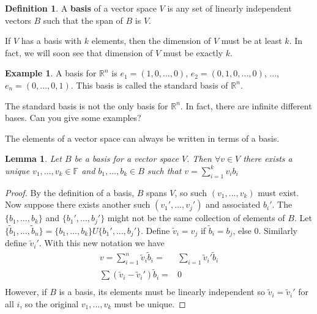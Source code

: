\documentclass[12pt,reqno]{amsart}
\def\F{\mathbb{F}}
\def\R{\mathbb{R}}
\newtheorem{lemma}{Lemma}[section]
\theoremstyle{definition}
\newtheorem{definition}{Definition}[section]
\newtheorem{example}{Example}[section]
\begin{document}
\begin{definition}
  A \textbf{basis} of a vector space $V$ is any set of linearly
  independent vectors $B$ such that the span of $B$ is $V$.
\end{definition}
If $V$ has a basis with $k$ elements, then the dimension of $V$ must
be at least $k$. In fact, we will soon see that dimension of $V$ must
be exactly $k$.
\begin{example}
  A basis for $\R^n$ is $e_1 = (1, 0, ..., 0 )$, $e_2 = (0, 1, 0, ...,
  0)$, $...$, $e_n = (0, ... , 0 , 1)$. This basis is called the
  standard basis of $\R^n$. 

  The standard basis is not the only basis for $\R^n$. In fact, there
  are infinite different bases. Can you give some examples?
\end{example}
The elements of a vector space can always be written in terms of a
basis. 
\begin{lemma} \label{lem:uniqueRep}
  Let $B$ be a basis for a vector space $V$. Then
  $\forall v \in V$ there exists a unique $v_1, ..., v_k \in \F$ and
  $b_1, ..., b_k \in B$
  such that $ v = \sum_{i=1}^k v_i b_i$  
\end{lemma}
\begin{proof}
  By the definition of a basis, $B$ spans $V$, so such
  $(v_1, ..., v_k)$ must exist. Now suppose there exists another such
  $(v_1', ..., v_j')$ and associated $b_i'$. The $\{b_1, ..., b_k\}$ and
  $\{b_1', ..., b_j'\}$ might not be the same collection of elements
  of $B$. Let $\{\tilde{b}_1, ..., \tilde{b}_n \} =  \{b_1, ...,
  b_k\} U \{b_1', ..., b_j'\}$. Define $\tilde{v}_i = v_j$ if
  $\tilde{b}_i = b_j$, else $0$. Similarly define $\tilde{v}_i'$. With
  this new notation we have
  \begin{align*}
    v = \sum_{i=1}^n \tilde{v}_i \tilde{b}_i = & \sum_{i=1} \tilde{v}_i' \tilde{b}_i \\
    \sum (\tilde{v}_i - \tilde{v}_i')\tilde{b}_i = & 0 \\
  \end{align*}
  However, if $B$ is a basis, its elements must be linearly
  independent so $\tilde{v}_i = \tilde{v}_i'$ for all $i$, so the
  original $v_1, ..., v_k$ must be unique.
\end{proof}
\end{document}
